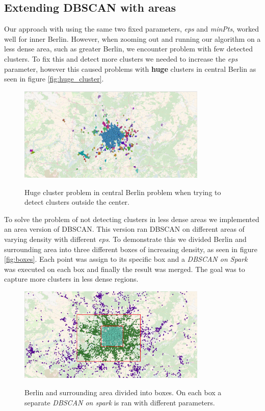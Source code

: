 \subsection{Extending DBSCAN with areas}
 Our approach with using the same two fixed parameters, \textit{eps} and \textit{minPts}, worked well for inner Berlin. However, when zooming out and running our algorithm on a less dense area, such as greater Berlin, we encounter problem with few detected clusters. To fix this and detect more clusters we needed to increase the \textit{eps} parameter, however this caused problems with \textbf{huge} clusters in central Berlin as seen in figure \autoref{fig:huge_cluster}.
\begin{figure}[!ht]
	\centering
	\includegraphics[width=0.8\textwidth]{images/big_cluster.PNG}\\
	\caption{ Huge cluster problem in central Berlin problem when trying to detect clusters outside the center. }
	\label{fig:huge_cluster}
\end{figure}
To solve the problem of not detecting clusters in less dense areas we implemented an area version of DBSCAN. This version ran DBSCAN on different areas of varying density with different \textit{eps}. To demonstrate this we divided Berlin and surrounding area into three different boxes of increasing density, as seen in figure \autoref{fig:boxes}. Each point was assign to its specific box and a \textit{DBSCAN on Spark} was executed on each box and finally the result was merged. The goal was to capture more clusters in less dense regions. 
\begin{figure}[!ht]
	\centering
	\includegraphics[width=0.8\textwidth]{images/boxes.PNG}\\
	\caption{  Berlin and surrounding area divided into boxes. On each box a separate\textit{ DBSCAN on spark} is ran with different parameters. }
	\label{fig:boxes}
\end{figure}
